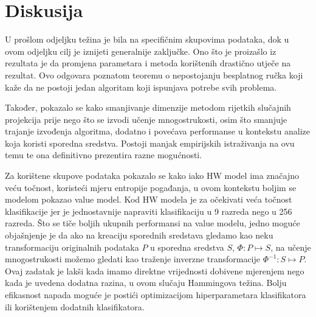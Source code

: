 \documentclass[times, utf8, diplomski]{fer}
\begin{document}
\section{Diskusija}
U prošlom odjeljku težina je bila na specifičnim skupovima podataka, dok u ovom odjeljku cilj je iznijeti generalnije zaključke. Ono što je proizašlo iz rezultata je da promjena parametara i metoda korištenih drastično utječe na rezultat. Ovo odgovara poznatom teoremu o nepostojanju besplatnog ručka  koji kaže da ne postoji jedan algoritam koji ispunjava potrebe svih problema.

Također, pokazalo se kako smanjivanje dimenzije metodom rijetkih slučajnih projekcija prije nego što se izvodi učenje mnogostrukosti, osim što smanjuje trajanje izvođenja algoritma, dodatno i povećava performanse u kontekstu analize koja koristi sporedna sredstva. Postoji manjak empirijskih istraživanja na ovu temu te ona definitivno prezentira razne mogućnosti.

Za korištene skupove podataka pokazalo se kako iako HW model ima značajno veću točnost, koristeći mjeru entropije pogađanja, u ovom kontekstu boljim se modelom pokazao value model. Kod HW modela je za očekivati veća točnost klasifikacije jer je jednostavnije napraviti klasifikaciju u 9 razreda nego u 256 razreda. Što se tiče boljih ukupnih performansi na value modelu, jedno moguće objašnjenje je da ako na kreaciju sporednih sredstava gledamo kao neku transformaciju originalnih podataka $P$ u sporedna sredstva $S$, $\Phi: P \mapsto S$, na učenje mnogostrukosti možemo gledati kao traženje inverzne transformacije $\Phi^{-1}: S \mapsto P$. Ovaj zadatak je lakši kada imamo direktne vrijednosti dobivene mjerenjem nego kada je uvedena dodatna razina, u ovom slučaju Hammingova težina.
Bolju efikasnost napada moguće je postići optimizacijom hiperparametara klasifikatora ili korištenjem dodatnih klasifikatora.
\end{document}
